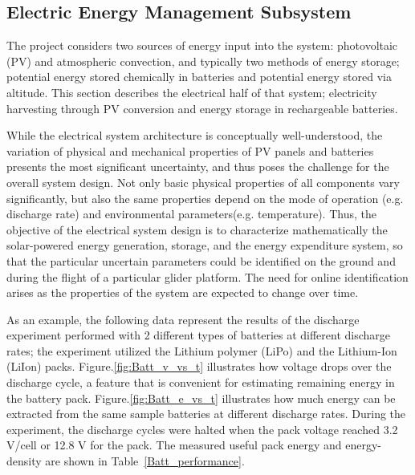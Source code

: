 \documentclass{ifacconf}
\newcommand{\squeezeup}{\vspace{-2.0mm}}
\begin{document}
\subsection{Electric Energy Management Subsystem}
\label{subsec:Electric} \squeezeup

The project considers two sources of energy input into the system:
photovoltaic (PV) and atmospheric convection, and typically two methods of
energy storage; potential energy stored chemically in batteries and potential
energy stored via altitude. This section describes the electrical half of
that system; electricity harvesting through PV conversion and energy storage
in rechargeable batteries.

While the electrical system architecture is conceptually well-understood, the
variation of physical and mechanical properties of PV panels and batteries
presents the most significant uncertainty, and thus poses the challenge for
the overall system design. Not only basic physical properties of all
components vary significantly, but also the same properties depend on the
mode of operation (e.g. discharge rate) and environmental parameters(e.g.
temperature). Thus, the objective of the electrical system design is to
characterize mathematically the solar-powered energy generation, storage, and
the energy expenditure system, so that the particular uncertain parameters
could be identified on the ground and during the flight of a particular
glider platform. The need for online identification arises as the properties
of the system are expected to change over time.

As an example, the following data represent the results of the discharge
experiment performed with 2 different types of batteries at different
discharge rates; the experiment utilized the Lithium polymer (LiPo) and the
Lithium-Ion (LiIon) packs. Figure.\ref{fig:Batt_v_vs_t} illustrates how
voltage drops over the discharge cycle, a feature that is convenient for
estimating remaining energy in the battery pack. Figure.\ref{fig:Batt_e_vs_t}
illustrates how much energy can be extracted from the same sample batteries
at different discharge rates. During the experiment, the discharge cycles
were halted when the pack voltage reached 3.2 V/cell or 12.8 V for the pack.
The measured useful pack energy and energy-density are shown in
Table~\ref{Batt_performance}.
\end{document}
